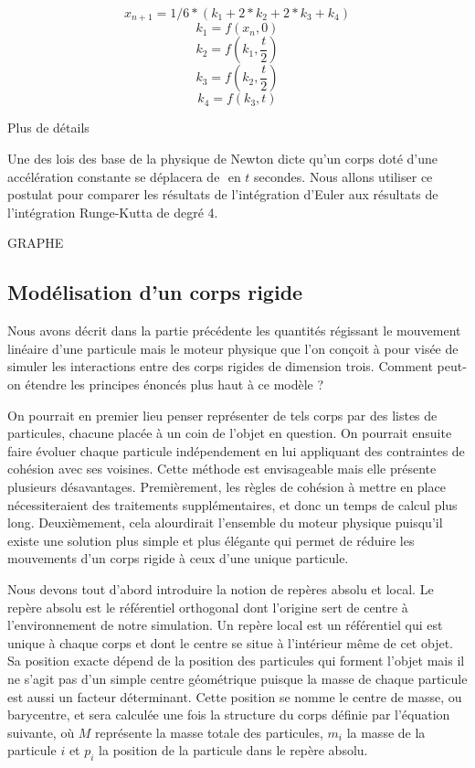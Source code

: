 \documentclass[twocolumn]{article}
\begin{document}
\[x_{n+1} = 1 / 6 * (k_1 + 2 * k_2 + 2 * k_3 + k_4)\]
\[k_1 = f(x_n, 0)\]
\[k_2 = f(k_1, \frac{t}{2})\]
\[k_3 = f(k_2, \frac{t}{2})\]
\[k_4 = f(k_3, t)\]

Plus de détails

Une des lois des base de la physique de Newton dicte qu'un corps doté d'une accélération constante se déplacera de $ $ en $t$ secondes. Nous allons utiliser ce postulat pour comparer les résultats de l'intégration d'Euler aux résultats de l'intégration Runge-Kutta de degré 4.

GRAPHE

\subsection{Modélisation d'un corps rigide}

Nous avons décrit dans la partie précédente les quantités régissant le mouvement linéaire d'une particule mais le moteur physique que l'on conçoit à pour visée de simuler les interactions entre des corps rigides de dimension trois. Comment peut-on étendre les principes énoncés plus haut à ce modèle ?

On pourrait en premier lieu penser représenter de tels corps par des listes de particules, chacune placée à un coin de l'objet en question. On pourrait ensuite faire évoluer chaque particule indépendement en lui appliquant des contraintes de cohésion avec ses voisines. Cette méthode est envisageable mais elle présente plusieurs désavantages. Premièrement, les règles de cohésion à mettre en place nécessiteraient des traitements supplémentaires, et donc un temps de calcul plus long. Deuxièmement, cela alourdirait l'ensemble du moteur physique puisqu'il existe une solution plus simple et plus élégante qui permet de réduire les mouvements d'un corps rigide à ceux d'une unique particule.

Nous devons tout d'abord introduire la notion de repères absolu et local. Le repère absolu est le référentiel orthogonal dont l'origine sert de centre à l'environnement de notre simulation. Un repère local est un référentiel qui est unique à chaque corps et dont le centre se situe à l'intérieur même de cet objet. Sa position exacte dépend de la position des particules qui forment l'objet mais il ne s'agit pas d'un simple centre géométrique puisque la masse de chaque particule est aussi un facteur déterminant. Cette position se nomme le centre de masse, ou barycentre, et sera calculée une fois la structure du corps définie par l'équation suivante, o\`u $M$ représente la masse totale des particules, $m_i$ la masse de la particule $i$ et $p_i$ la position de la particule dans le repère absolu.
\end{document}
